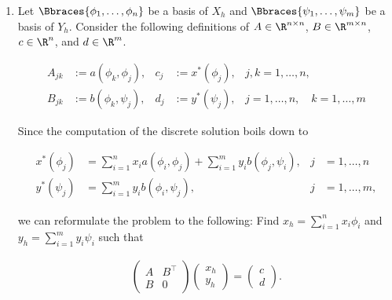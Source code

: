 \begin{solution}

\phantom{}

\begin{enumerate}[label = \textbf{\alph*)}]

  \item Let $\Bbraces{\phi_1, \dots, \phi_n}$ be a basis of $X_h$ and $\Bbraces{\psi_1, \dots, \psi_m}$ be a basis of $Y_h$.
  Consider the following definitions of $A \in \R^{n \times n}$, $B \in \R^{m \times n}$, $c \in \R^n$, and $d \in \R^m$.

  \begin{align*}
    A_{j k} & := a(\phi_k, \phi_j), & c_j & := x^\ast(\phi_j), & j, k = 1, \dots, n, \\
    B_{j k} & := b(\phi_k, \psi_j), & d_j & := y^\ast(\psi_j), & j    = 1, \dots, n, \quad k = 1, \dots, m
  \end{align*}

  Since the computation of the discrete solution boils down to

  \begin{align*}
    x^\ast(\phi_j) & = \sum_{i=1}^n x_i a(\phi_i, \phi_j) + \sum_{i=1}^m y_i b(\phi_j,\psi_i), & j & = 1, \dots, n \\
    y^\ast(\psi_j) & = \sum_{i=1}^m y_i b(\phi_i, \psi_j),                                     & j & = 1, \dots, m,
  \end{align*}

  we can reformulate the problem to the following:
  Find $x_h = \sum_{i=1}^n x_i \phi_i$ and $y_h = \sum_{i=1}^m y_i \psi_i$ such that

  \begin{align*}
    \begin{pmatrix}
      A & B^{\top} \\
      B & 0
    \end{pmatrix}
    \begin{pmatrix}
      x_h \\ y_h
    \end{pmatrix}
    =
    \begin{pmatrix}
      c \\ d
    \end{pmatrix}.
  \end{align*}

  \begin{comment}

    \item Let $B$ be regular, then the $m$ lower rows of $M$ must be linearly independent,
    which implies $\ran(B) = \R^m$. \\
    Conversely, suppose $M\cdot x = 0$ for $x \neq 0$. This implies $(x_1,\dots,x_n) \in \ker(B)$.
    Since $A$ is positive definite on $\ker$


\end{comment}
\end{enumerate}
\end{solution}

